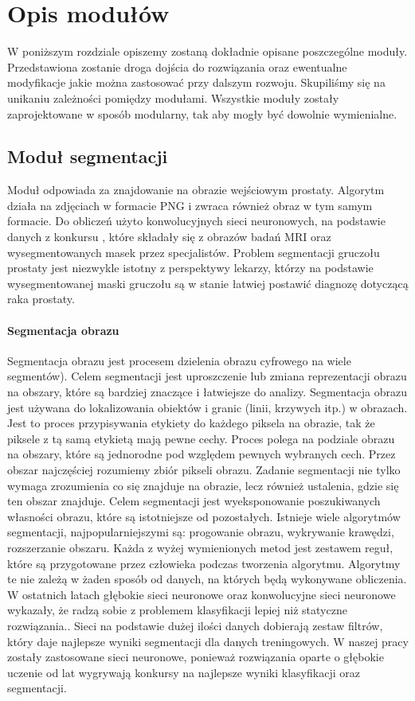 \documentclass[a4paper,11pt,twoside]{report}
\theoremstyle{definition}
\begin{document}
\chapter{Opis modułów}

W poniższym rozdziale opiszemy zostaną dokładnie opisane poszczególne moduły. Przedstawiona zostanie droga dojścia do rozwiązania oraz ewentualne modyfikacje jakie można zastosować przy dalszym rozwoju. Skupiliśmy się na unikaniu zależności pomiędzy modułami. Wszystkie moduły zostały zaprojektowane w sposób modularny, tak aby mogły być dowolnie wymienialne. 

\section{Moduł segmentacji}

Moduł odpowiada za znajdowanie na obrazie wejściowym prostaty. Algorytm działa na zdjęciach w formacie PNG i zwraca również obraz w tym samym formacie. Do obliczeń użyto konwolucyjnych sieci neuronowych, na podstawie danych z konkursu \cite{konkurs}, które składały się  z obrazów badań MRI oraz wysegmentowanych masek przez specjalistów. Problem segmentacji gruczołu prostaty jest niezwykle istotny z perspektywy lekarzy, którzy na podstawie wysegmentowanej maski gruczołu są w stanie łatwiej postawić diagnozę dotyczącą raka prostaty.

\subsubsection{Segmentacja obrazu}

Segmentacja obrazu jest procesem dzielenia obrazu cyfrowego na wiele segmentów). Celem segmentacji jest uproszczenie lub zmiana reprezentacji obrazu na obszary, które są bardziej znaczące i łatwiejsze do analizy. Segmentacja obrazu jest używana do lokalizowania obiektów i granic (linii, krzywych itp.) w obrazach. Jest to proces przypisywania etykiety do każdego piksela na obrazie, tak że piksele z tą samą etykietą mają pewne cechy. Proces polega na podziale obrazu na  obszary, które są jednorodne pod względem pewnych wybranych cech. Przez obszar najczęściej rozumiemy zbiór pikseli obrazu. Zadanie segmentacji nie tylko wymaga zrozumienia co się znajduje na obrazie, lecz również ustalenia, gdzie się ten obszar znajduje. Celem segmentacji jest wyeksponowanie  poszukiwanych własności obrazu, które są istotniejsze od pozostałych. Istnieje wiele algorytmów segmentacji, najpopularniejszymi są: progowanie obrazu, wykrywanie krawędzi, rozszerzanie obszaru. Każda z wyżej wymienionych metod jest zestawem reguł, które są przygotowane przez człowieka podczas tworzenia algorytmu. Algorytmy te nie zależą w żaden sposób od danych, na których będą wykonywane obliczenia. W ostatnich latach głębokie sieci neuronowe oraz konwolucyjne sieci neuronowe wykazały, że radzą sobie z problemem klasyfikacji lepiej niż statyczne rozwiązania.\cite{imageOrg}. Sieci na podstawie dużej ilości danych dobierają zestaw filtrów, który daje najlepsze wyniki segmentacji dla danych treningowych. W naszej pracy zostały zastosowane sieci neuronowe, ponieważ rozwiązania oparte o głębokie uczenie od lat wygrywają konkursy na najlepsze wyniki  klasyfikacji oraz segmentacji. 
\end{document}
